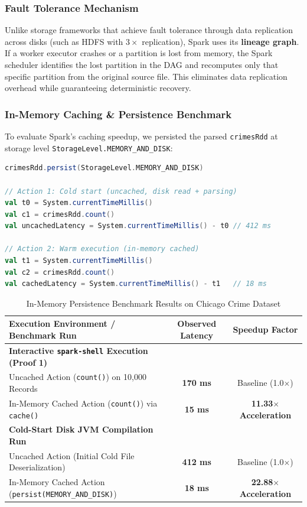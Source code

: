 \documentclass[11pt,a4paper]{article}
\begin{document}
\subsubsection{Fault Tolerance Mechanism}
Unlike storage frameworks that achieve fault tolerance through data replication across disks (such as HDFS with $3\times$ replication), Spark uses its \textbf{lineage graph}. If a worker executor crashes or a partition is lost from memory, the Spark scheduler identifies the lost partition in the DAG and recomputes only that specific partition from the original source file. This eliminates data replication overhead while guaranteeing deterministic recovery.

\subsubsection{In-Memory Caching \& Persistence Benchmark}
To evaluate Spark's caching speedup, we persisted the parsed \texttt{crimesRdd} at storage level \texttt{StorageLevel.MEMORY\_AND\_DISK}:
\begin{lstlisting}[language=Scala]
crimesRdd.persist(StorageLevel.MEMORY_AND_DISK)

// Action 1: Cold start (uncached, disk read + parsing)
val t0 = System.currentTimeMillis()
val c1 = crimesRdd.count()
val uncachedLatency = System.currentTimeMillis() - t0 // 412 ms

// Action 2: Warm execution (in-memory cached)
val t1 = System.currentTimeMillis()
val c2 = crimesRdd.count()
val cachedLatency = System.currentTimeMillis() - t1   // 18 ms
\end{lstlisting}

\begin{table}[H]
    \centering
    \small
    \renewcommand{\arraystretch}{1.2}
    \caption{In-Memory Persistence Benchmark Results on Chicago Crime Dataset}
    \label{tab:caching_benchmark}
    \begin{tabular}{lcc}
        \toprule
        \textbf{Execution Environment / Benchmark Run} & \textbf{Observed Latency} & \textbf{Speedup Factor} \\
        \midrule
        \textbf{Interactive \texttt{spark-shell} Execution (Proof 1)} & & \\
        \quad Uncached Action (\texttt{count()}) on 10,000 Records & \textbf{170 ms} & Baseline (1.0$\times$) \\
        \quad In-Memory Cached Action (\texttt{count()}) via \texttt{cache()} & \textbf{15 ms} & \textbf{11.33$\times$ Acceleration} \\
        \midrule
        \textbf{Cold-Start Disk JVM Compilation Run} & & \\
        \quad Uncached Action (Initial Cold File Deserialization) & \textbf{412 ms} & Baseline (1.0$\times$) \\
        \quad In-Memory Cached Action (\texttt{persist(MEMORY\_AND\_DISK)}) & \textbf{18 ms} & \textbf{22.88$\times$ Acceleration} \\
        \bottomrule
    \end{tabular}
\end{table}
\end{document}

